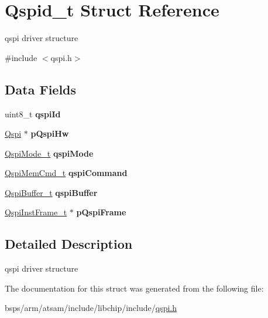 \hypertarget{structQspid__t}{}\section{Qspid\+\_\+t Struct Reference}
\label{structQspid__t}


qspi driver structure  




{\ttfamily \#include $<$qspi.\+h$>$}

\subsection*{Data Fields}
\begin{DoxyCompactItemize}
\item 
\mbox{\label{structQspid__t_a2d0b48cb30e8433403f9f023e486c317}} 
uint8\+\_\+t {\bfseries qspi\+Id}
\item 
\mbox{\label{structQspid__t_a1a1fed1b6d9166f7ce34e8101cc77a32}} 
\mbox{\hyperlink{structQspi}{Qspi}} $\ast$ {\bfseries p\+Qspi\+Hw}
\item 
\mbox{\label{structQspid__t_aa66aef9087c56d064f6e49428de55f30}} 
\mbox{\hyperlink{qspi_8h_aca4d7775cab4dd1c0cd15e3049c00d11}{Qspi\+Mode\+\_\+t}} {\bfseries qspi\+Mode}
\item 
\mbox{\label{structQspid__t_aa8f261648e1f7ab43912b314c663546a}} 
\mbox{\hyperlink{structQspiMemCmd__t}{Qspi\+Mem\+Cmd\+\_\+t}} {\bfseries qspi\+Command}
\item 
\mbox{\label{structQspid__t_af9e3c5cbc138db91a5254944fe8b80c2}} 
\mbox{\hyperlink{structQspiBuffer__t}{Qspi\+Buffer\+\_\+t}} {\bfseries qspi\+Buffer}
\item 
\mbox{\label{structQspid__t_ac5ba86e320ed97b65c533eaef776aad6}} 
\mbox{\hyperlink{structQspiInstFrame__t}{Qspi\+Inst\+Frame\+\_\+t}} $\ast$ {\bfseries p\+Qspi\+Frame}
\end{DoxyCompactItemize}


\subsection{Detailed Description}
qspi driver structure 

The documentation for this struct was generated from the following file\+:\begin{DoxyCompactItemize}
\item 
bsps/arm/atsam/include/libchip/include/\mbox{\hyperlink{qspi_8h}{qspi.\+h}}\end{DoxyCompactItemize}

